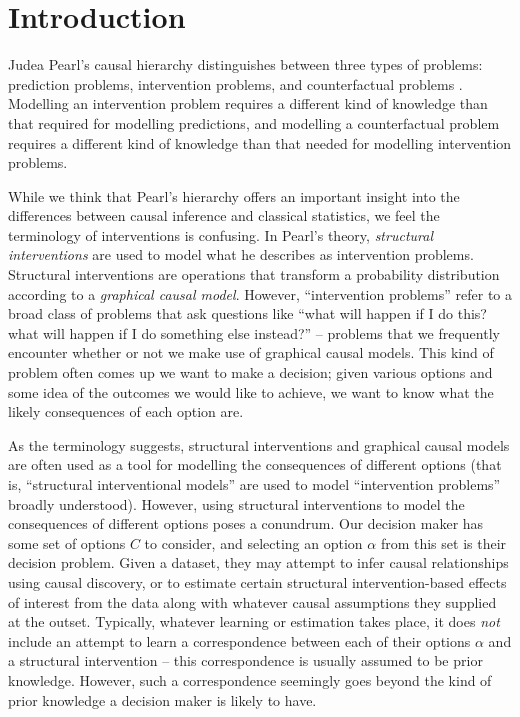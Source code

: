 \documentclass[USenglish,onecolumn]{article}
\begin{document}

 

\maketitle
\section{Introduction}

Judea Pearl's causal hierarchy distinguishes between three types of problems: prediction problems, intervention problems, and counterfactual problems \citep{pearl_book_2018}. Modelling an intervention problem requires a different kind of knowledge than that required for modelling predictions, and modelling a counterfactual problem requires a different kind of knowledge than that needed for modelling intervention problems.

While we think that Pearl's hierarchy offers an important insight into the differences between causal inference and classical statistics, we feel the terminology of interventions is confusing. In Pearl's theory, \emph{structural interventions} are used to model what he describes as intervention problems. Structural interventions are operations that transform a probability distribution according to a \emph{graphical causal model}. However, ``intervention problems'' refer to a broad class of problems that ask questions like ``what will happen if I do this? what will happen if I do something else instead?'' -- problems that we frequently encounter whether or not we make use of graphical causal models. This kind of problem often comes up we want to make a decision; given various options and some idea of the outcomes we would like to achieve, we want to know what the likely consequences of each option are.

As the terminology suggests, structural interventions and graphical causal models are often used as a tool for modelling the consequences of different options (that is, ``structural interventional models'' are used to model ``intervention problems'' broadly understood). However, using structural interventions to model the consequences of different options poses a conundrum. Our decision maker has some set of options $C$ to consider, and selecting an option $\alpha$ from this set is their decision problem. Given a dataset, they may attempt to infer causal relationships using causal discovery, or to estimate certain structural intervention-based effects of interest from the data along with whatever causal assumptions they supplied at the outset. Typically, whatever learning or estimation takes place, it does \emph{not} include an attempt to learn a correspondence between each of their options $\alpha$ and a structural intervention -- this correspondence is usually assumed to be prior knowledge. However, such a correspondence seemingly goes beyond the kind of prior knowledge a decision maker is likely to have.
\end{document}

